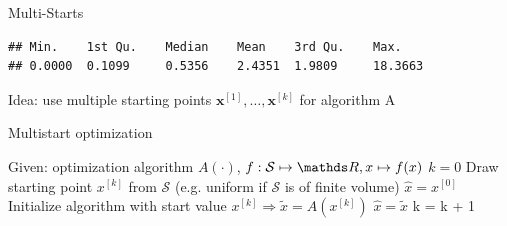 \documentclass[11pt,compress,t,notes=noshow, xcolor=table]{beamer}
\begin{document}
\begin{vbframe}{Multi-Starts}
\footnotesize
\begin{verbatim}
## Min.    1st Qu.    Median    Mean    3rd Qu.    Max.
## 0.0000  0.1099     0.5356    2.4351  1.9809     18.3663
\end{verbatim}








\framebreak
\normalsize








\normalsize
\framebreak

Idea: use multiple starting points $\bm{x}^{[1]}, \ldots, \bm{x}^{[k]}$ for algorithm A

\begin{algorithm}[H]
  \begin{footnotesize}
  \begin{center}
  \caption{Multistart optimization}
    \begin{algorithmic}[1]
    \State Given: optimization algorithm $A(\cdot)$, $f: \mathcal{S} \mapsto \R, x \mapsto f(x)$
    \State $k = 0$
      \Repeat
        \State Draw starting point  $x^{[k]}$ from $\mathcal{S}$ (e.g. uniform if $\mathcal{S}$ is of finite volume)
          $\hat{x}= x^{[0]}$
        \EndIf
        \State Initialize algorithm with start value $x^{[k]} \Rightarrow \tilde{x} = A(x^{[k]})$
          $\hat{x} = \tilde{x}$
        \EndIf
        \State k = k + 1
      \\
    \end{algorithmic}
    \end{center}
    \end{footnotesize}
\end{algorithm}


\end{vbframe}
\end{document}
